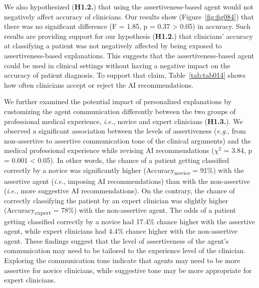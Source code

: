 

We also hypothesized ({\bf H1.2.}) that using the assertiveness-based agent would not negatively affect accuracy of clinicians.
Our results show (Figure~\ref{fig:fig084}) that there was no significant difference (F = 1.85, p = 0.37 > 0.05) in accuracy.
Such results are providing support for our hypothesis ({\bf H1.2.}) that clinicians' accuracy at classifying a patient was not negatively affected by being exposed to assertiveness-based explanations.
This suggests that the assertiveness-based agent could be used in clinical settings without having a negative impact on the accuracy of patient diagnosis.
To support that claim, Table~\ref{tab:tab014} shows how often clinicians accept or reject the AI recommendations.

We further examined the potential impact of personalized explanations by customizing the agent communication differently between the two groups of professional medical experience, {\it i.e.}, novice and expert clinicians ({\bf H1.3.}).
We observed a significant association between the levels of assertiveness ({\it e.g.}, from non-assertive to assertive communication tone of the clinical arguments) and the medical professional experience while revising AI recommendations ($\chi^2$ = 3.84, p = 0.001 < 0.05).
In other words, the chance of a patient getting classified correctly by a novice was significantly higher (Accuracy\textsubscript{novice} = 91\%) with the assertive agent ({\it i.e.}, imposing AI recommendations) than with the non-assertive ({\it i.e.}, more suggestive AI recommendations).
On the contrary, the chance of correctly classifying the patient by an expert clinician was slightly higher (Accuracy\textsubscript{expert} = 78\%) with the non-assertive agent.
The odds of a patient getting classified correctly by a novice had 17.4\% chance higher with the assertive agent, while expert clinicians had 4.4\% chance higher with the non-assertive agent.
These findings suggest that the level of assertiveness of the agent's communication may need to be tailored to the experience level of the clinician.
Exploring the communication tone indicate that agents may need to be more assertive for novice clinicians, while suggestive tone may be more appropriate for expert clinicians.


